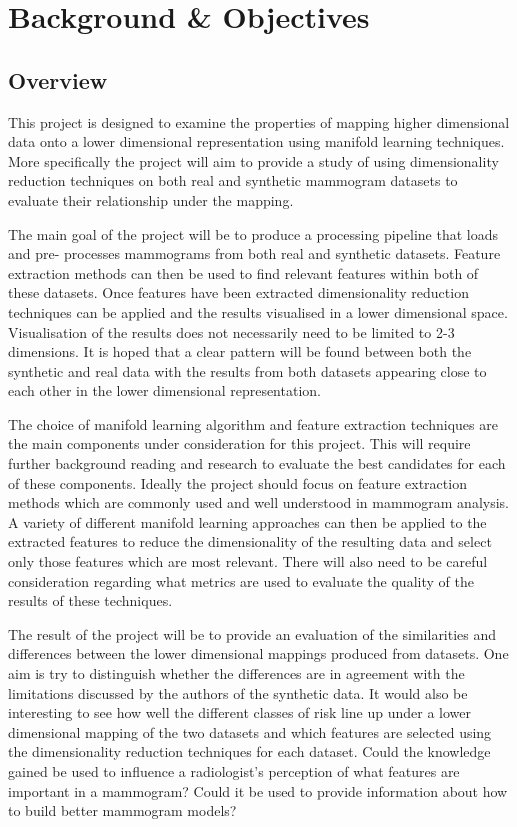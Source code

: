 \chapter{Background \& Objectives}

\section{Overview}
This project is designed to examine the properties of mapping higher dimensional data onto a lower dimensional representation using manifold learning techniques. More specifically the project will aim to provide a study of using dimensionality reduction techniques on both real and synthetic \cite{bakic2002mammogram1, bakic2002mammogram2, bakic2003mammogram3} mammogram datasets to evaluate their relationship under the mapping.

The main goal of the project will be to produce a processing pipeline that loads and pre- processes mammograms from both real and synthetic datasets. Feature extraction methods can then be used to find relevant features within both of these datasets. Once features have been extracted dimensionality reduction techniques can be applied and the results visualised in a lower dimensional space. Visualisation of the results does not necessarily need to be limited to 2-3 dimensions. It is hoped that a clear pattern will be found between both the synthetic and real data with the results from both datasets appearing close to each other in the lower dimensional representation.

The choice of manifold learning algorithm and feature extraction techniques are the main components under consideration for this project. This will require further background reading and research to evaluate the best candidates for each of these components. Ideally the project should focus on feature extraction methods which are commonly used and well understood in mammogram analysis. A variety of different manifold learning approaches can then be applied to the extracted features to reduce the dimensionality of the resulting data and select only those features which are most relevant. There will also need to be careful consideration regarding what metrics are used to evaluate the quality of the results of these techniques.

The result of the project will be to provide an evaluation of the similarities and differences between the lower dimensional mappings produced from datasets. One aim is try to distinguish whether the differences are in agreement with the limitations discussed by the authors of the synthetic data. It would also be interesting to see how well the different classes of risk line up under a lower dimensional mapping of the two datasets and which features are selected using the dimensionality reduction techniques for each dataset. Could the knowledge gained be used to influence a radiologist’s perception of what features are important in a mammogram? Could it be used to provide information about how to build better mammogram models?

